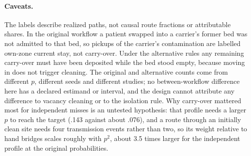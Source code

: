 \paragraph{Caveats.} The labels describe realized paths, not causal route
fractions or attributable shares. In the original workflow a patient swapped
into a carrier's former bed was not admitted to that bed, so pickups of the
carrier's contamination are labelled own-zone current stay, not carry-over. Under
the alternative rules any remaining carry-over must have been deposited while
the bed stood empty, because moving in does not trigger cleaning. The original
and alternative counts come from different $p$, different seeds and different
studies; no between-workflow difference here has a declared estimand or
interval, and the design cannot attribute any difference to vacancy cleaning or
to the isolation rule. Why carry-over mattered most for independent misses is an
untested hypothesis: that profile needs a larger $p$ to reach the target (.143
against about .076), and a route through an initially clean site needs four
transmission events rather than two, so its weight relative to hand bridges
scales roughly with $p^2$, about 3.5 times larger for the independent profile at
the original probabilities.

